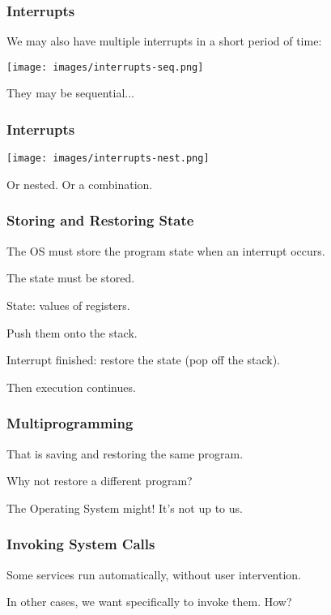 \begin{frame}
	\frametitle{Interrupts}

	We may also have multiple interrupts in a short period of time:

	\begin{center}
		\texttt{[image: images/interrupts-seq.png]}
	\end{center}

	They may be sequential...

\end{frame}

\begin{frame}
	\frametitle{Interrupts}

	\begin{center}
		\texttt{[image: images/interrupts-nest.png]}
	\end{center}

	Or nested. Or a combination.

\end{frame}

\begin{frame}
	\frametitle{Storing and Restoring State}

	The OS must store the program state when an interrupt occurs.

	The state must be stored.

	State: values of registers.

	Push them onto the stack.

	Interrupt finished: restore the state (pop off the stack).

	Then execution continues.

\end{frame}

\begin{frame}
	\frametitle{Multiprogramming}
	That is saving and restoring the same program.

	Why not restore a different program?

	The Operating System might! It's not up to us.


\end{frame}

\begin{frame}
	\frametitle{Invoking System Calls}

	Some services run automatically, without user intervention.

	In other cases, we want specifically to invoke them. How?

\end{frame}


